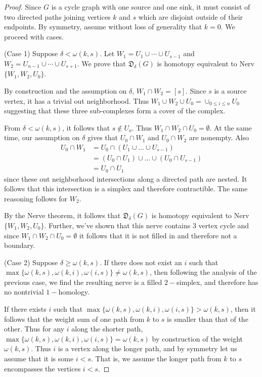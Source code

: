 \documentclass[pdflatex,bst/sn-mathphys-num]{sn-jnl}%
\theoremstyle{thmstyleone}%
\theoremstyle{definition}
\theoremstyle{thmstyletwo}%
\newcommand{\FD}{\mathfrak{D}}
\theoremstyle{thmstylethree}%
\begin{document}
\begin{proof}
    Since $G$ is a cycle graph with one source and one sink, it must consist of two directed paths joining vertices $k$ and $s$ which are disjoint outside of their endpoints. By symmetry, assume without loss of generality that $k=0$. We proceed with cases.

    (Case 1)
    Suppose $\delta<\omega(k,s)$. Let $W_1=U_1\cup \cdots\cup U_{s-1}$ and $W_2=U_{n-1}\cup \cdots \cup U_{s+1}$. We prove that $\FD_\delta(G)$ is homotopy equivalent to Nerv$\{W_1,W_2,U_0\}$.

    By construction and the assumption on $\delta$,  $W_1\cap W_2=[s]$. Since $s$ is a source vertex, it has a trivial out neighborhood. Thus $W_1\cup W_2\cup U_0=\cup_{0\leq i\leq n}U_0$ suggesting that these three sub-complexes form a cover of the complex.

    From $\delta<\omega(k,s)$, it follows that $s\not\in U_o$. Thus $W_1\cap W_2\cap U_0=\emptyset$. At the same time, our assumption on $\delta$ gives that $U_0\cap W_1$ and $U_0\cap W_2$ are nonempty. Also
    \begin{align*}
        U_0\cap W_1 &=  U_0\cap (U_1\cup\dotsc\cup U_{s-1})\\
        &=\left(U_0\cap U_1\right) \cup \dotsc \cup \left(U_0\cap U_{s-1}\right)\\
        &=U_0\cap U_1
    \end{align*}
    since these out neighborhood intersections along a directed path are nested. It follows that this intersection is a simplex and therefore contractible. The same reasoning follows for $W_2$. 

    By the Nerve theorem, it follows that $\FD_\delta(G)$ is homotopy equivalent to Nerv$\{W_1,W_2,U_0\}$. Further, we've shown that this nerve contains $3$ vertex cycle and since $W_1\cap W_2\cap U_0=\emptyset$ it follows that it is not filled in and therefore not a boundary.

    (Case 2) 
    Suppose $\delta\geq\omega(k,s)$. If there does not exist an $i$ such that $\max\{\omega(k,s),\omega(k,i),\omega(i,s)\}\neq \omega(k,s)$, then following the analysis of the previous case, we find the resulting nerve is a filled $2-$simplex, and therefore has no nontrivial $1-$homology.
    
    If there exists $i$ such that $\max\{\omega(k,s),\omega(k,i),\omega(i,s)\}> \omega(k,s)$, then it follows that the weight sum of one path from $k$ to $s$ is smaller than that of the other. Thus for any $i$ along the shorter path, $\max\{\omega(k,s),\omega(k,i),\omega(i,s)\}= \omega(k,s)$ by construction of the weight $\omega(k,s)$. Thus $i$ is a vertex along the longer path, and by symmetry let us assume that it is some $i<s$. That is, we assume the longer path from $k$ to $s$ encompasses the vertices $i<s$. 
    

\end{proof}
\end{document}
